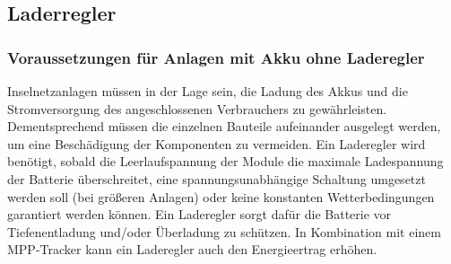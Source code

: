 \subsection{Laderregler}
\subsubsection{Voraussetzungen für Anlagen mit Akku ohne Laderegler}
Inselnetzanlagen müssen in der Lage sein, die Ladung des Akkus und die Stromversorgung des angeschlossenen Verbrauchers zu gewährleisten. Dementsprechend müssen die einzelnen Bauteile aufeinander ausgelegt werden, um eine Beschädigung der Komponenten zu vermeiden. Ein Laderegler wird benötigt, sobald die Leerlaufspannung der Module die maximale Ladespannung der Batterie überschreitet, eine spannungsunabhängige Schaltung umgesetzt werden soll (bei größeren Anlagen) oder keine konstanten Wetterbedingungen garantiert werden können. Ein Laderegler sorgt dafür die Batterie vor Tiefenentladung und/oder Überladung zu schützen. In Kombination mit einem MPP-Tracker kann ein Laderegler auch den Energieertrag erhöhen. 
